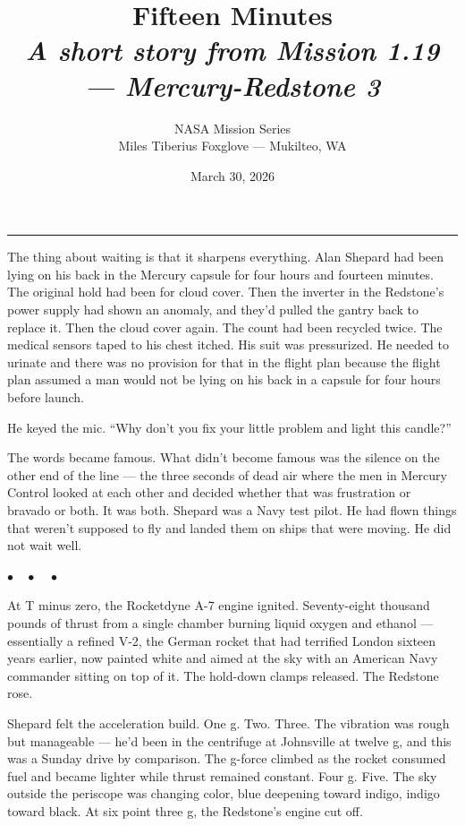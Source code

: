 \documentclass[12pt, letterpaper]{article}
\title{\Huge\textbf{Fifteen Minutes}\\[0.5em]\large\textit{A short story from Mission 1.19 --- Mercury-Redstone 3}}
\author{NASA Mission Series\\[0.3em]\small Miles Tiberius Foxglove --- Mukilteo, WA}
\date{March 30, 2026}
\begin{document}
\maketitle
\thispagestyle{empty}

\vspace{1em}
\noindent\rule{\textwidth}{0.4pt}
\vspace{1em}

\noindent The thing about waiting is that it sharpens everything. Alan Shepard had been lying on his back in the Mercury capsule for four hours and fourteen minutes. The original hold had been for cloud cover. Then the inverter in the Redstone's power supply had shown an anomaly, and they'd pulled the gantry back to replace it. Then the cloud cover again. The count had been recycled twice. The medical sensors taped to his chest itched. His suit was pressurized. He needed to urinate and there was no provision for that in the flight plan because the flight plan assumed a man would not be lying on his back in a capsule for four hours before launch.

He keyed the mic. ``Why don't you fix your little problem and light this candle?''

The words became famous. What didn't become famous was the silence on the other end of the line --- the three seconds of dead air where the men in Mercury Control looked at each other and decided whether that was frustration or bravado or both. It was both. Shepard was a Navy test pilot. He had flown things that weren't supposed to fly and landed them on ships that were moving. He did not wait well.

\begin{center}
$\bullet\quad\bullet\quad\bullet$
\end{center}

At T minus zero, the Rocketdyne A-7 engine ignited. Seventy-eight thousand pounds of thrust from a single chamber burning liquid oxygen and ethanol --- essentially a refined V-2, the German rocket that had terrified London sixteen years earlier, now painted white and aimed at the sky with an American Navy commander sitting on top of it. The hold-down clamps released. The Redstone rose.

Shepard felt the acceleration build. One g. Two. Three. The vibration was rough but manageable --- he'd been in the centrifuge at Johnsville at twelve g, and this was a Sunday drive by comparison. The g-force climbed as the rocket consumed fuel and became lighter while thrust remained constant. Four g. Five. The sky outside the periscope was changing color, blue deepening toward indigo, indigo toward black. At six point three g, the Redstone's engine cut off.
\end{document}
